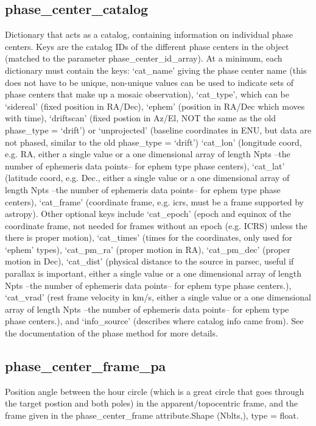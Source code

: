 \documentclass[12pt]{article}
\begin{document}
\subsection{phase\_center\_catalog}
Dictionary that acts as a catalog, containing information on individual phase centers. 
Keys are the catalog IDs of the different phase centers in the object (matched to the parameter phase\_center\_id\_array). 
At a minimum, each dictionary must contain the keys: 
‘cat\_name’ giving the phase center name (this does not have to be unique, non-unique values can be used to indicate sets of phase centers that make up a mosaic observation), 
‘cat\_type’, which can be ‘sidereal’ (fixed position in RA/Dec), ‘ephem’ (position in RA/Dec which moves with time), ‘driftscan’ (fixed postion in Az/El, NOT the same as the old phase\_type = ‘drift’) or ‘unprojected’ (baseline coordinates in ENU, but data are not phased, similar to the old phase\_type = ‘drift’) 
‘cat\_lon’ (longitude coord, e.g. RA, either a single value or a one dimensional array of length Npts –the number of ephemeris data points– for ephem type phase centers), 
‘cat\_lat’ (latitude coord, e.g. Dec., either a single value or a one dimensional array of length Npts –the number of ephemeris data points– for ephem type phase centers), 
‘cat\_frame’ (coordinate frame, e.g. icrs, must be a frame supported by astropy). 
Other optional keys include 
‘cat\_epoch’ (epoch and equinox of the coordinate frame, not needed for frames without an epoch (e.g. ICRS) unless the there is proper motion), 
‘cat\_times’ (times for the coordinates, only used for ‘ephem’ types), 
‘cat\_pm\_ra’ (proper motion in RA), 
‘cat\_pm\_dec’ (proper motion in Dec), 
‘cat\_dist’ (physical distance to the source in parsec, useful if parallax is important, either a single value or a one dimensional array of length Npts –the number of ephemeris data points– for ephem type phase centers.), 
‘cat\_vrad’ (rest frame velocity in km/s, either a single value or a one dimensional array of length Npts –the number of ephemeris data points– for ephem type phase centers.), and 
‘info\_source’ (describes where catalog info came from). See the documentation of the phase method for more details.


\subsection{phase\_center\_frame\_pa}
Position angle between the hour circle (which is a great circle that goes through the target postion and both poles) in the apparent/topocentric frame, and the frame given in the phase\_center\_frame attribute.Shape (Nblts,), type = float.
\end{document}
